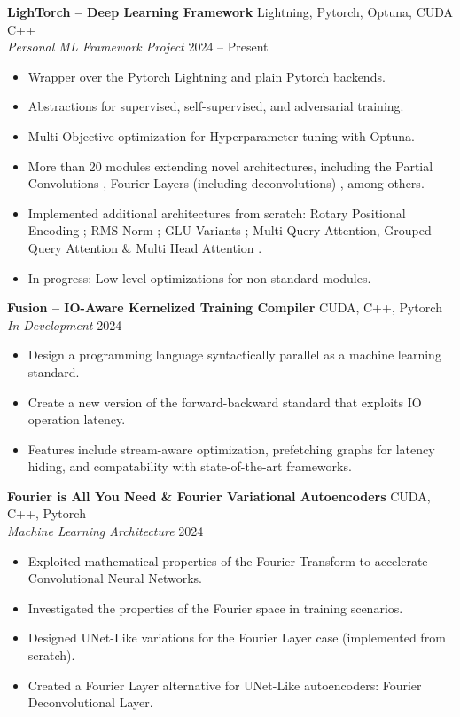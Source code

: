 \documentclass[11pt]{article}
\begin{document}
\textbf{LighTorch – Deep Learning Framework} \hfill Lightning, Pytorch, Optuna, CUDA C++ \\
\textit{Personal ML Framework Project} \hfill 2024 – Present
\begin{itemize}[noitemsep]
    \item Wrapper over the Pytorch Lightning and plain Pytorch backends.
    \item Abstractions for supervised, self-supervised, and adversarial training.
    \item Multi-Objective optimization for Hyperparameter tuning with Optuna.
    \item More than 20 modules extending novel architectures, including the Partial Convolutions \cite{conv}, Fourier Layers (including deconvolutions) \cite{fourier}, among others.
    \item Implemented additional architectures from scratch: Rotary Positional Encoding \cite{pe}; RMS Norm \cite{norm}; GLU Variants \cite{ffw}; Multi Query Attention, Grouped Query Attention \& Multi Head Attention \cite{attention}.
    \item In progress: Low level optimizations for non-standard modules.
\end{itemize}

\textbf{Fusion – IO-Aware Kernelized Training Compiler} \hfill CUDA, C++, Pytorch\\
\textit{In Development} \hfill 2024
\begin{itemize}[noitemsep]
    \item Design a programming language syntactically parallel as a machine learning standard.
    \item Create a new version of the forward-backward standard that exploits IO operation latency.
    \item Features include stream-aware optimization, prefetching graphs for latency hiding, and compatability with state-of-the-art frameworks.
\end{itemize}

\textbf{Fourier is All You Need \& Fourier Variational Autoencoders} \hfill CUDA, C++, Pytorch \\
\textit{Machine Learning Architecture} \hfill 2024
\begin{itemize}[noitemsep]
    \item Exploited mathematical properties of the Fourier Transform to accelerate Convolutional Neural Networks.
    \item Investigated the properties of the Fourier space in training scenarios.
    \item Designed UNet-Like variations for the Fourier Layer case \cite{fourier} (implemented from scratch).
    \item Created a Fourier Layer alternative for UNet-Like autoencoders: Fourier Deconvolutional Layer.
\end{itemize}
\end{document}
